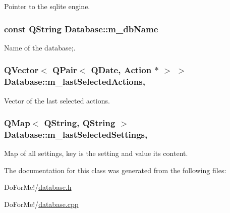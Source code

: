 Pointer to the sqlite engine. 

\hypertarget{class_database_ae86350d76c5160ec0bcd2b352e82248a}{
\subsubsection[{m\-\_\-db\-Name}]{\setlength{\rightskip}{0pt plus 5cm}const Q\-String Database\-::m\-\_\-db\-Name\hspace{0.3cm}{\ttfamily [private]}}}\label{class_database_ae86350d76c5160ec0bcd2b352e82248a}


Name of the database;. 

\hypertarget{class_database_a235387dc22dc1a6057af86c330440dca}{
\subsubsection[{m\-\_\-last\-Selected\-Actions}]{\setlength{\rightskip}{0pt plus 5cm}Q\-Vector$<$ Q\-Pair$<$ Q\-Date, {\bf Action} $\ast$ $>$ $>$ Database\-::m\-\_\-last\-Selected\-Actions\hspace{0.3cm}{\ttfamily [static]}, {\ttfamily [private]}}}\label{class_database_a235387dc22dc1a6057af86c330440dca}


Vector of the last selected actions. 

\hypertarget{class_database_a5196350281ff8662de16ea7fd06c0e8a}{
\subsubsection[{m\-\_\-last\-Selected\-Settings}]{\setlength{\rightskip}{0pt plus 5cm}Q\-Map$<$ Q\-String, Q\-String $>$ Database\-::m\-\_\-last\-Selected\-Settings\hspace{0.3cm}{\ttfamily [static]}, {\ttfamily [private]}}}\label{class_database_a5196350281ff8662de16ea7fd06c0e8a}


Map of all settings, key is the setting and value its content. 



The documentation for this class was generated from the following files\-:\begin{DoxyCompactItemize}
\item 
Do\-For\-Me!/\hyperlink{database_8h}{database.\-h}\item 
Do\-For\-Me!/\hyperlink{database_8cpp}{database.\-cpp}\end{DoxyCompactItemize}
